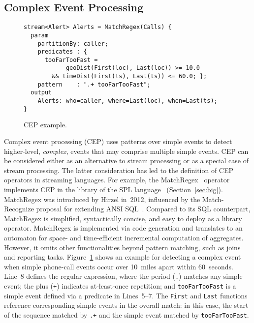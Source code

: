 \subsection{Complex Event Processing}\label{sec:cep} %

\begin{figure}[!h]
\begin{lstlisting}[morekeywords={stream,param,output}]
stream<Alert> Alerts = MatchRegex(Calls) {
  param
    partitionBy: caller;
    predicates : {
      tooFarTooFast =
            geoDist(First(loc), Last(loc)) >= 10.0
        && timeDist(First(ts), Last(ts)) <= 60.0; };
    pattern    : ".+ tooFarTooFast";
  output
    Alerts: who=caller, where=Last(loc), when=Last(ts);
}
\end{lstlisting}
\vspace*{-4mm}
\caption{\label{fig:cep}CEP example.}
\end{figure}

Complex event processing (CEP) uses patterns over simple events to
detect higher-level, \emph{complex}, events that may comprise multiple
simple events.  CEP can be considered either as an alternative to
stream processing or as a special case of stream processing. The
latter consideration has led to the definition of CEP operators in
streaming languages. For example, the \textsf{MatchRegex}~\cite{hirzel_2012}
operator implements CEP in the library of the SPL
language~\cite{hirzel_schneider_gedik_2017} (Section~\ref{sec:big}). MatchRegex was introduced by Hirzel in~2012,
influenced by the \textsf{Match-Recognize} proposal for extending ANSI
SQL~\cite{zemke_et_al_2007}.  Compared to its SQL counterpart,
MatchRegex is simplified, syntactically concise, and easy to deploy as
a library operator. MatchRegex is implemented via code generation and
translates to an automaton for space- and time-efficient incremental
computation of aggregates. However, it omits other
functionalities beyond pattern matching, such as joins and reporting
tasks. Figure~\ref{fig:cep} shows an example for detecting a complex
event when simple phone-call events occur over 10~miles apart within
60~seconds. Line~8 defines the regular expression, where the period
(\lstinline{.}) matches any simple event; the plus (\lstinline{+})
indicates at-least-once repetition; and \lstinline{tooFarTooFast} is a
simple event defined via a predicate in \mbox{Lines 5--7}. The
\lstinline{First} and \lstinline{Last} functions reference
corresponding simple events in the overall match: in this case, the
start of the sequence matched by \lstinline{.+} and the simple event matched by
\lstinline{tooFarTooFast}.


